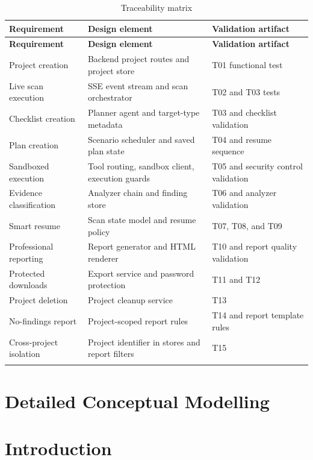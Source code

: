 \documentclass[12pt,a4paper]{report}
\begin{document}
\begin{longtable}{|p{}|p{}|p{}|}
\hline
\textbf{Requirement} & \textbf{Design element} & \textbf{Validation artifact} \\
\hline
\endfirsthead
\hline
\textbf{Requirement} & \textbf{Design element} & \textbf{Validation artifact} \\
\hline
\endhead
Project creation & Backend project routes and project store & T01 functional test \\
\hline
Live scan execution & SSE event stream and scan orchestrator & T02 and T03 tests \\
\hline
Checklist creation & Planner agent and target-type metadata & T03 and checklist validation \\
\hline
Plan creation & Scenario scheduler and saved plan state & T04 and resume sequence \\
\hline
Sandboxed execution & Tool routing, sandbox client, execution guards & T05 and security
control validation \\
\hline
Evidence classification & Analyzer chain and finding store & T06 and analyzer validation \\
\hline
Smart resume & Scan state model and resume policy & T07, T08, and T09 \\
\hline
Professional reporting & Report generator and HTML renderer & T10 and report quality
validation \\
\hline
Protected downloads & Export service and password protection & T11 and T12 \\
\hline
Project deletion & Project cleanup service & T13 \\
\hline
No-findings report & Project-scoped report rules & T14 and report template rules \\
\hline
Cross-project isolation & Project identifier in stores and report filters & T15 \\
\hline
\caption{Traceability matrix}
\label{tab:traceability_matrix}
\end{longtable}

\section{Detailed Conceptual Modelling}

\section*{Introduction}
\end{document}
